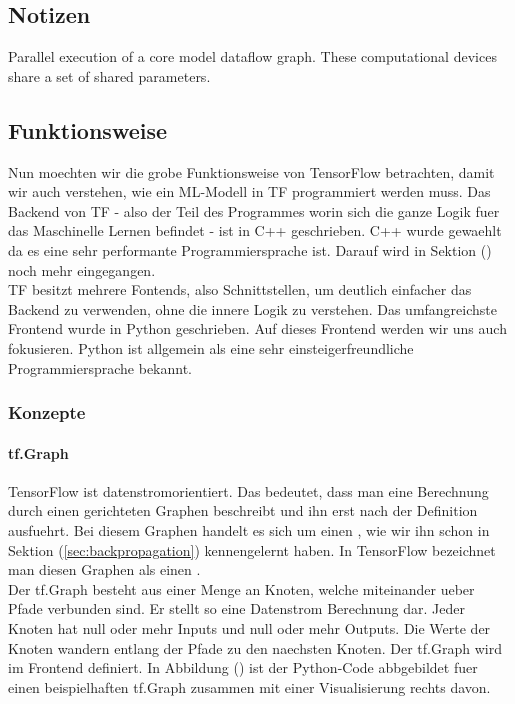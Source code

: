 \para{}
\cite{book:tensorflow}

\subsection{Notizen}
Parallel execution of a core model dataflow graph. These computational devices
share a set of shared parameters.

\subsection{Funktionsweise}
Nun moechten wir die grobe Funktionsweise von TensorFlow betrachten, damit wir
auch verstehen, wie ein ML-Modell in TF programmiert werden muss.
\para{}
Das Backend von TF - also der Teil des Programmes worin sich die ganze Logik
fuer das Maschinelle Lernen befindet - ist in C++ geschrieben. C++ wurde
gewaehlt da es eine sehr performante Programmiersprache ist. Darauf wird in
Sektion () noch mehr eingegangen. \\
TF besitzt mehrere Fontends, also Schnittstellen, um deutlich einfacher das
Backend zu verwenden, ohne die innere Logik zu verstehen. Das umfangreichste
Frontend wurde in Python geschrieben. Auf dieses Frontend werden wir uns auch
fokusieren. Python ist allgemein als eine sehr einsteigerfreundliche
Programmiersprache bekannt.


\subsubsection{Konzepte}
\paragraph{tf.Graph}
TensorFlow ist datenstromorientiert. Das bedeutet, dass man eine Berechnung
durch einen gerichteten Graphen beschreibt und ihn erst nach der Definition
ausfuehrt. Bei diesem Graphen handelt es sich um einen , wie wir ihn schon in Sektion (\ref{sec:backpropagation}) kennengelernt
haben. In TensorFlow bezeichnet man diesen Graphen als einen
. \\
Der tf.Graph besteht aus einer Menge an Knoten, welche miteinander ueber Pfade
verbunden sind. Er stellt so eine Datenstrom Berechnung dar. Jeder Knoten hat
null oder mehr Inputs und null oder mehr Outputs. Die Werte der Knoten wandern
entlang der Pfade zu den naechsten Knoten.
Der tf.Graph wird im Frontend definiert. In Abbildung () ist der Python-Code
abbgebildet fuer einen beispielhaften tf.Graph zusammen mit einer Visualisierung
rechts davon.

